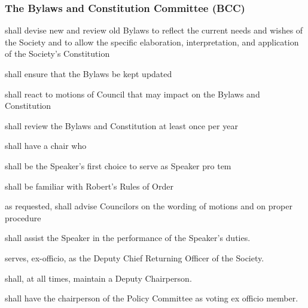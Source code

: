 \subsubsection{The Bylaws and Constitution Committee (BCC)}
\begin{longenum}[ label*=\thesubsubsection.\arabic*., align=left]
	\item shall devise new and review old Bylaws to reflect the current needs and wishes of the Society and to allow the specific elaboration, interpretation, and application of the Society's Constitution 
    \item shall ensure that the Bylaws be kept updated
    \item shall react to motions of Council that may impact on the Bylaws and Constitution
    \item shall review the Bylaws and Constitution at least once per year
    \item shall have a chair who
    \begin{longenum}[ label*=\arabic*., align=left]
		\item shall be the Speaker's first choice to serve as Speaker pro tem
        \item shall be familiar with Robert's Rules of Order
        \item as requested, shall advise Councilors on the wording of motions and on proper procedure
        \item shall assist the Speaker in the performance of the Speaker's duties.
        \item serves, ex-officio, as the Deputy Chief Returning Officer of the Society.
     
        \end{longenum}
    \item shall, at all times, maintain a Deputy Chairperson.
    \item shall have the chairperson of the Policy Committee as voting ex officio member.
\end{longenum}

